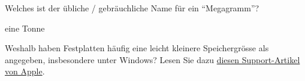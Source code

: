 \begin{myexercise}
	Welches ist der übliche / gebräuchliche Name für ein \enquote{Megagramm}?
	\begin{myanswer}
		eine Tonne
	\end{myanswer}
\end{myexercise}

\begin{mychallenge}
	Weshalb haben Festplatten häufig eine leicht kleinere Speichergrösse als angegeben, insbesondere unter Windows? Lesen Sie dazu \href{https://support.apple.com/en-us/102119}{diesen Support-Artikel von Apple}.
\end{mychallenge}
